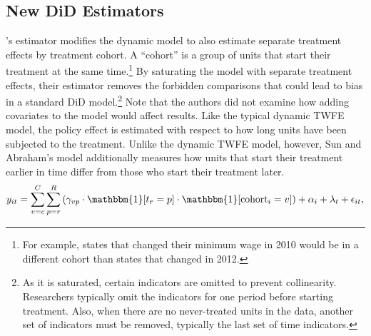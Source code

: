 \documentclass[12pt]{article}
\begin{document}
\subsection{New DiD Estimators}
\citet{sunabr2021a}’s estimator modifies the dynamic model to also estimate separate treatment effects by treatment cohort. A “cohort” is a group of units that start their treatment at the same time.\footnote{For example, states that changed their minimum wage in 2010 would be in a different cohort than states that changed in 2012.}  By saturating the model with separate treatment effects, their estimator removes the forbidden comparisons that could lead to bias in a standard DiD model.\footnote{As it is saturated, certain indicators are omitted to prevent collinearity. Researchers typically omit the indicators for one period before starting treatment. Also, when there are no never-treated units in the data, another set of indicators must be removed, typically the last set of time indicators.}  Note that the authors did not examine how adding covariates to the model would affect results. Like the typical dynamic TWFE model, the policy effect is estimated with respect to how long units have been subjected to the treatment. Unlike the dynamic TWFE model, however, Sun and Abraham’s model additionally measures how units that start their treatment earlier in time differ from those who start their treatment later.
\begin{equation}
    y_{it} = \sum_{v=c}^C\sum_{p=r}^R\left(\gamma_{vp}\cdot\mathbbm{1}[t_r=p]\cdot \mathbbm{1}[\text{cohort}_i=v]\right) + \alpha_i + \lambda_t + \epsilon_{it},
\end{equation}
\end{document}
